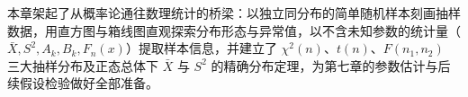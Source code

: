 \begin{summary}[第六章核心脉络]
本章架起了从概率论通往数理统计的桥梁：以独立同分布的简单随机样本刻画抽样数据，用直方图与箱线图直观探索分布形态与异常值，以不含未知参数的统计量（$\bar{X},S^2,A_k,B_k,F_n(x)$）提取样本信息，并建立了 $\chi^2(n)$、$t(n)$、$F(n_1,n_2)$ 三大抽样分布及正态总体下 $\bar{X}$ 与 $S^2$ 的精确分布定理，为第七章的参数估计与后续假设检验做好全部准备。
\end{summary}
